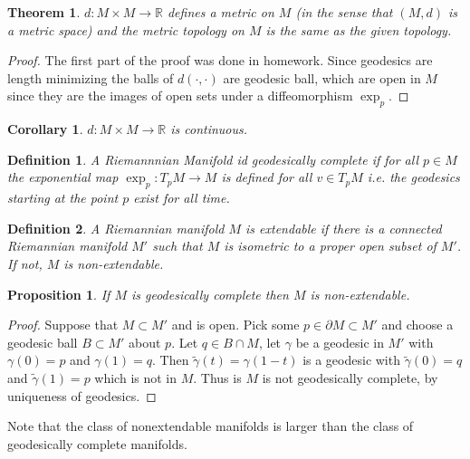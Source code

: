 \documentclass[a4paper]{article}
\newtheorem*{prop}{Proposition}
\newtheorem*{defn}{Definition}
\newtheorem*{thm}{Theorem}
\newtheorem*{cor}{Corollary}
\begin{document}
\begin{thm}
  $d: M \times M \rightarrow \mathds{R}$ defines a metric on $M$ (in the sense that $(M,d)$ is a metric space) and the metric topology on $M$ is the same as the given topology.
\end{thm}

\begin{proof}
  The first part of the proof was done in homework. Since geodesics are length minimizing the balls of $d(\cdot, \cdot)$ are geodesic ball, which are open in $M$ since they are the images of open sets under a diffeomorphism $\exp_p$.
\end{proof}

\begin{cor}
  $d: M \times M \rightarrow \mathds{R}$ is continuous. 
\end{cor}

\begin{defn}
  A Riemannnian Manifold id geodesically complete  if for all $p \in M$ the exponential map $\exp_p: T_pM \rightarrow M$ is defined for all $v \in T_pM$ i.e. the geodesics starting at the point $p$ exist for all time.
\end{defn}

\begin{defn}
  A Riemannian manifold $M$ is extendable if there is a connected Riemannian manifold $M'$ such that $M$ is isometric to a proper open subset of $M'$. If not, $M$ is non-extendable.
\end{defn}

\begin{prop}
  If $M$ is geodesically complete then $M$ is non-extendable.
\end{prop}

\begin{proof}
  Suppose that $M \subset M'$ and is open. Pick some $p \in \partial M \subset M'$ and choose a geodesic ball $B \subset M'$ about $p$. Let $q \in B \cap  M$, let $\gamma$ be a geodesic in $M'$ with $\gamma(0) = p$ and $\gamma(1) = q$. Then $\tilde{\gamma}(t) = \gamma(1-t)$ is a geodesic with $\tilde{\gamma}(0) = q$ and $\tilde{\gamma}(1) = p$ which is not in $M$. Thus is $M$ is not geodesically complete, by uniqueness of geodesics.
\end{proof}

Note that the class of nonextendable manifolds is larger than the class of geodesically complete manifolds. 
\end{document}
